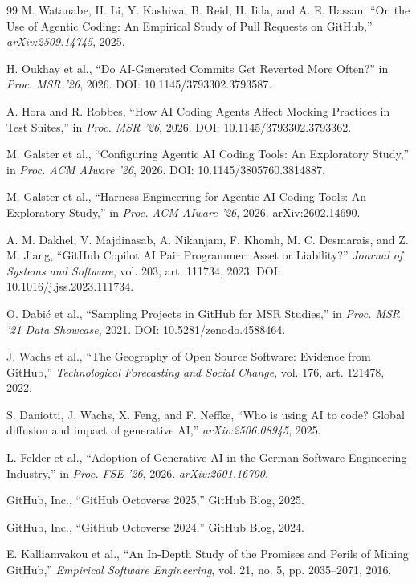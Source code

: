 \documentclass[11pt,a4paper]{article}
\begin{document}
\begin{thebibliography}{99}
M. Watanabe, H. Li, Y. Kashiwa, B. Reid, H. Iida, and A. E. Hassan,
``On the Use of Agentic Coding: An Empirical Study of Pull Requests on GitHub,''
\textit{arXiv:2509.14745}, 2025.

H. Oukhay et al.,
``Do AI-Generated Commits Get Reverted More Often?''
in \textit{Proc. MSR '26}, 2026. DOI: 10.1145/3793302.3793587.

A. Hora and R. Robbes,
``How AI Coding Agents Affect Mocking Practices in Test Suites,''
in \textit{Proc. MSR '26}, 2026. DOI: 10.1145/3793302.3793362.

M. Galster et al.,
``Configuring Agentic AI Coding Tools: An Exploratory Study,''
in \textit{Proc. ACM AIware '26}, 2026. DOI: 10.1145/3805760.3814887.

M. Galster et al.,
``Harness Engineering for Agentic AI Coding Tools: An Exploratory Study,''
in \textit{Proc. ACM AIware '26}, 2026. arXiv:2602.14690.

A. M. Dakhel, V. Majdinasab, A. Nikanjam, F. Khomh, M. C. Desmarais,
and Z. M. Jiang,
``GitHub Copilot AI Pair Programmer: Asset or Liability?''
\textit{Journal of Systems and Software}, vol. 203, art. 111734, 2023.
DOI: 10.1016/j.jss.2023.111734.

O. Dabi\'{c} et al.,
``Sampling Projects in GitHub for MSR Studies,''
in \textit{Proc. MSR '21 Data Showcase}, 2021. DOI: 10.5281/zenodo.4588464.

J. Wachs et al.,
``The Geography of Open Source Software: Evidence from GitHub,''
\textit{Technological Forecasting and Social Change}, vol. 176, art. 121478, 2022.

S. Daniotti, J. Wachs, X. Feng, and F. Neffke,
``Who is using AI to code? Global diffusion and impact of generative AI,''
\textit{arXiv:2506.08945}, 2025.

L. Felder et al.,
``Adoption of Generative AI in the German Software Engineering Industry,''
in \textit{Proc. FSE '26}, 2026. \textit{arXiv:2601.16700}.

GitHub, Inc.,
``GitHub Octoverse 2025,'' GitHub Blog, 2025.

GitHub, Inc.,
``GitHub Octoverse 2024,'' GitHub Blog, 2024.

E. Kalliamvakou et al.,
``An In-Depth Study of the Promises and Perils of Mining GitHub,''
\textit{Empirical Software Engineering}, vol. 21, no. 5, pp. 2035--2071, 2016.


\end{thebibliography}
\end{document}
